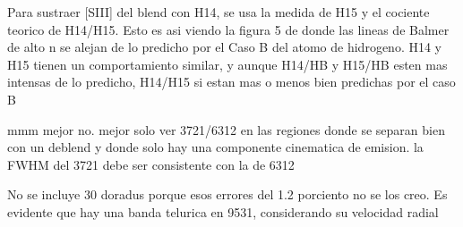 \documentclass[fleqn,usenatbib]{mnras}
\begin{document}
Para sustraer  [SIII] del blend con H14, se usa la medida de H15 y el cociente teorico de H14/H15. Esto es asi viendo la figura 5 de \citet{mesadelgado09} donde las lineas de Balmer de alto n se alejan de lo predicho por el Caso B del atomo de hidrogeno. H14 y H15 tienen un comportamiento similar, y aunque H14/HB y H15/HB esten mas intensas de lo predicho, H14/H15 si estan mas o menos bien predichas por el caso B 

mmm mejor no. mejor solo ver 3721/6312 en las regiones donde se separan bien con un deblend y donde solo hay una componente cinematica de emision. la FWHM del 3721 debe ser consistente con la de 6312



No se incluye 30 doradus porque esos errores del 1.2 porciento no se los creo. Es evidente que hay una banda telurica en 9531, considerando su velocidad radial
\end{document}
